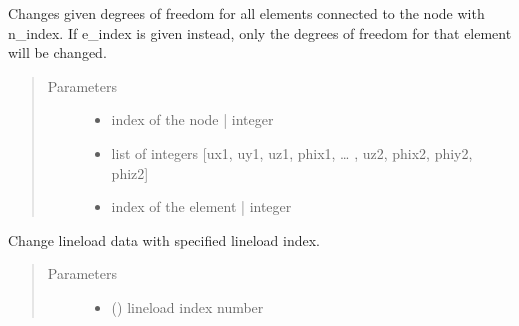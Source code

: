 \documentclass[letterpaper,10pt,english]{sphinxmanual}
\begin{document}
\begin{fulllineitems}
\begin{fulllineitems}
\label{\detokenize{api:beamon.database.database.Database.change_edof}}
Changes given degrees of freedom for all elements connected to the node with n\_index.
If e\_index is given instead, only the degrees of freedom for that element will be changed.
\begin{quote}\begin{description}
\item[{Parameters}] \leavevmode\begin{itemize}
\item {} 
 \textendash{} index of the node | integer

\item {} 
 \textendash{} list of integers {[}ux1, uy1, uz1, phix1, … , uz2, phix2, phiy2, phiz2{]}

\item {} 
 \textendash{} index of the element | integer

\end{itemize}

\end{description}\end{quote}

\end{fulllineitems}


\begin{fulllineitems}
\label{\detokenize{api:beamon.database.database.Database.change_lineload}}
Change lineload data with specified lineload index.
\begin{quote}\begin{description}
\item[{Parameters}] \leavevmode\begin{itemize}
\item {} 
 () \textendash{} lineload index number


\end{itemize}
\end{description}
\end{quote}
\end{fulllineitems}
\end{fulllineitems}
\end{document}
